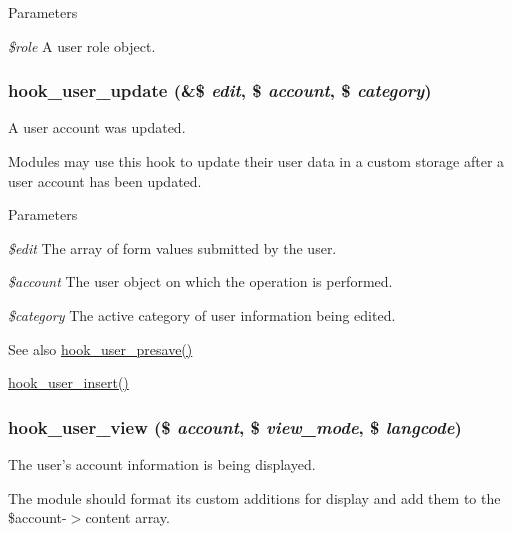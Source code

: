 \begin{DoxyParams}{Parameters}
\item[{\em \$role}]A user role object. \end{DoxyParams}
\hypertarget{group__hooks_gab71262402336071ef7c3d08f4c36e887}{
\subsubsection[{hook\_\-user\_\-update}]{\setlength{\rightskip}{0pt plus 5cm}hook\_\-user\_\-update (\&\$ {\em edit}, \/  \$ {\em account}, \/  \$ {\em category})}}
\label{group__hooks_gab71262402336071ef7c3d08f4c36e887}
A user account was updated.

Modules may use this hook to update their user data in a custom storage after a user account has been updated.


\begin{DoxyParams}{Parameters}
\item[{\em \$edit}]The array of form values submitted by the user. \item[{\em \$account}]The user object on which the operation is performed. \item[{\em \$category}]The active category of user information being edited.\end{DoxyParams}
\begin{DoxySeeAlso}{See also}
\hyperlink{group__hooks_gab6b224c35d7d97259d4350a7849f1e56}{hook\_\-user\_\-presave()} 

\hyperlink{group__hooks_gaa3e2c4c972ee796d216b15da7aaf9c2c}{hook\_\-user\_\-insert()} 
\end{DoxySeeAlso}
\hypertarget{group__hooks_gaafb9e35d1f82a33918437ad7acf29541}{
\subsubsection[{hook\_\-user\_\-view}]{\setlength{\rightskip}{0pt plus 5cm}hook\_\-user\_\-view (\$ {\em account}, \/  \$ {\em view\_\-mode}, \/  \$ {\em langcode})}}
\label{group__hooks_gaafb9e35d1f82a33918437ad7acf29541}
The user's account information is being displayed.

The module should format its custom additions for display and add them to the \$account-\/$>$content array.

